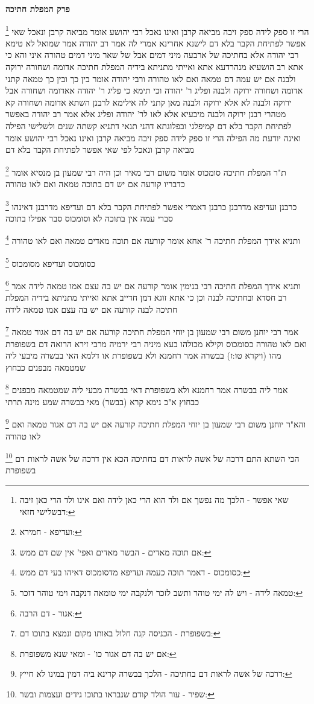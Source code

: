\documentclass[12pt, openany]{book}
\newcommand{\sethebfont}{
\fontsize{10.5pt}{21.0pt} \selectfont
}
\newcommand{\twocol}[1]{
	{\sethebfont \begin{multicols}{2}
			#1
	\end{multicols}}	
}
\newcommand{\chapname}{}
\newcommand{\newchap}[1]{
	\addcontentsline{toc}{chapter}{#1}
	\renewcommand{\chapname}{#1}
		\begin{center}
			\textbf{%
\fontsize{16pt}{16pt}\selectfont
				#1}
		\end{center}
}
\newcommand{\footnotecomment}[1]{
	\renewcommand\thefootnote{}
	\footnote{#1}}
\newcommand{\commenta}[1]{\footnotecomment{#1}}
\begin{document}
\newchap{פרק  המפלת חתיכה}
\twocol{
\commenta{שאי אפשר - הלכך מה נפשך אם ולד הוא הרי כאן לידה ואם אינו ולד הרי כאן זיבה דבשלישי חזאי:}
הרי זו ספק לידה ספק זיבה מביאה קרבן ואינו נאכל 
רבי יהושע אומר מביאה קרבן ונאכל שאי אפשר לפתיחת הקבר בלא דם 
לישנא אחרינא אמרי לה אמר רב יהודה אמר שמואל לא טימא רבי יהודה אלא בחתיכה של ארבעה מיני דמים אבל של שאר מיני דמים טהורה 
איני והא כי אתא רב הושעיא מנהרדעא אתא ואייתי מתניתא בידיה המפלת חתיכה אדומה ושחורה ירוקה ולבנה אם יש עמה דם טמאה ואם לאו טהורה ורבי יהודה אומר בין כך ובין כך טמאה 
קתני אדומה ושחורה ירוקה ולבנה ופליג ר' יהודה 
וכי תימא כי פליג ר' יהודה אאדומה ושחורה אבל ירוקה ולבנה לא אלא ירוקה ולבנה מאן קתני לה 
אילימא לרבנן השתא אדומה ושחורה קא מטהרי רבנן ירוקה ולבנה מיבעיא אלא לאו לר' יהודה ופליג
אלא אמר רב יהודה באפשר לפתיחת הקבר בלא דם קמיפלגי ובפלוגתא דהני תנאי דתניא קשתה שנים ולשלישי הפילה ואינה יודעת מה הפילה הרי זו ספק לידה ספק זיבה מביאה קרבן ואינו נאכל 
רבי יהושע אומר מביאה קרבן ונאכל לפי שאי אפשר לפתיחת הקבר בלא דם 
\commenta{ועדיפא - חמירא:}
ת"ר המפלת חתיכה סומכוס אומר משום רבי מאיר וכן היה רבי שמעון בן מנסיא אומר כדבריו קורעה אם יש דם בתוכה טמאה ואם לאו טהורה 
\commenta{אם תוכה מאדים - הבשר מאדים ואפי' אין שם דם ממש:}
כרבנן ועדיפא מדרבנן כרבנן דאמרי אפשר לפתיחת הקבר בלא דם ועדיפא מדרבנן דאינהו סברי עמה אין בתוכה לא וסומכוס סבר אפילו בתוכה 
\commenta{כסומכוס - דאמר תוכה כעמה ועדיפא מדסומכוס דאיהו בעי דם ממש:}
ותניא אידך המפלת חתיכה ר' אחא אומר קורעה אם תוכה מאדים טמאה ואם לאו טהורה 
\commenta{טמאה לידה - ויש לה ימי טוהר ותשב לזכר ולנקבה ימי טומאה דנקבה וימי טוהר דזכר:}
כסומכוס ועדיפא מסומכוס 
\commenta{אגור - דם הרבה:}
ותניא אידך המפלת חתיכה רבי בנימין אומר קורעה אם יש בה עצם אמו טמאה לידה אמר רב חסדא ובחתיכה לבנה וכן כי אתא זוגא דמן חדייב אתא ואייתי מתניתא בידיה המפלת חתיכה לבנה קורעה אם יש בה עצם אמו טמאה לידה 
\commenta{בשפופרת - הכניסה קנה חלול באותו מקום ונמצא בתוכו דם:}
אמר רבי יוחנן משום רבי שמעון בן יוחי המפלת חתיכה קורעה אם יש בה דם אגור טמאה ואם לאו טהורה כסומכוס וקילא מכולהו 
בעא מיניה רבי ירמיה מרבי זירא הרואה דם בשפופרת מהו (ויקרא טו:ז) בבשרה אמר רחמנא ולא בשפופרת או דלמא האי בבשרה מיבעי ליה שמטמאה מבפנים כבחוץ 
\commenta{אם יש בה דם אגור כו' - ומאי שנא משפופרת:}
אמר ליה בבשרה אמר רחמנא ולא בשפופרת דאי בבשרה מבעי ליה שמטמאה מבפנים כבחוץ א"כ נימא קרא (בבשר) מאי בבשרה שמע מינה תרתי 
\commenta{דרכה של אשה לראות דם בחתיכה - הלכך בבשרה קרינא ביה דמין במינו לא חייץ:}
והא"ר יוחנן משום רבי שמעון בן יוחי המפלת חתיכה קורעה אם יש בה דם אגור טמאה ואם לאו טהורה 
\commenta{שפיר - עור הולד קודם שנבראו בתוכו גידים ועצמות ובשר:}
הכי השתא התם דרכה של אשה לראות דם בחתיכה הכא אין דרכה של אשה לראות דם בשפופרת 
}
\end{document}
